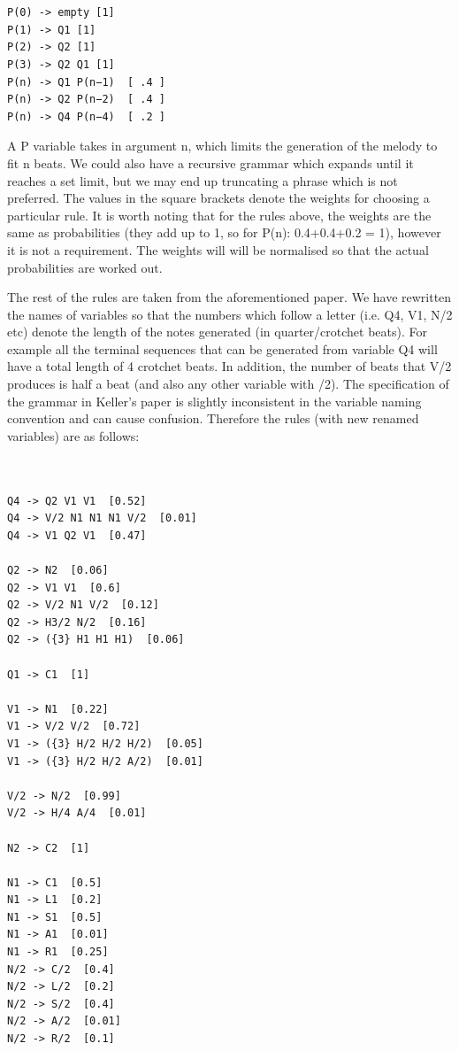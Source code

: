 \documentclass[pdftex,12pt,a4paper]{report}
\begin{document}
\begin{verbatim}


P(0) -> empty [1]
P(1) -> Q1 [1] 
P(2) -> Q2 [1] 
P(3) -> Q2 Q1 [1] 
P(n) -> Q1 P(n−1)  [ .4 ]
P(n) -> Q2 P(n−2)  [ .4 ] 
P(n) -> Q4 P(n−4)  [ .2 ]

\end{verbatim}

A P variable takes in argument n, which limits the generation of the melody to fit n beats. We could also have a recursive grammar which expands until it reaches a set limit, but we may end up truncating a phrase which is not preferred. The values in the square brackets denote the weights for choosing a particular rule. It is worth noting that for the rules above, the weights are the same as probabilities (they add up to 1, so for P(n):  0.4+0.4+0.2 = 1), however it is not a requirement. The weights will will be normalised so that the actual probabilities are worked out.

The rest of the rules are taken from the aforementioned paper. We have rewritten the names of variables so that the numbers which follow a letter (i.e. Q4, V1, N/2 etc) denote the length of the notes generated (in quarter/crotchet beats). For example all the terminal sequences that can be generated from variable Q4 will have a total length of 4 crotchet beats. In addition, the number of beats that V/2 produces is half a beat (and also any other variable with /2). The specification of the grammar in Keller's paper \cite{keller07} is slightly inconsistent in the variable naming convention and can cause confusion. Therefore the rules (with new renamed variables) are as follows:

\begin{verbatim}


Q4 -> Q2 V1 V1  [0.52]
Q4 -> V/2 N1 N1 N1 V/2  [0.01]
Q4 -> V1 Q2 V1  [0.47]

Q2 -> N2  [0.06]
Q2 -> V1 V1  [0.6]
Q2 -> V/2 N1 V/2  [0.12]
Q2 -> H3/2 N/2  [0.16]
Q2 -> ({3} H1 H1 H1)  [0.06]

Q1 -> C1  [1]

V1 -> N1  [0.22]
V1 -> V/2 V/2  [0.72]
V1 -> ({3} H/2 H/2 H/2)  [0.05]
V1 -> ({3} H/2 H/2 A/2)  [0.01]

V/2 -> N/2  [0.99]
V/2 -> H/4 A/4  [0.01]

N2 -> C2  [1]

N1 -> C1  [0.5]
N1 -> L1  [0.2]
N1 -> S1  [0.5]
N1 -> A1  [0.01]
N1 -> R1  [0.25]
N/2 -> C/2  [0.4]
N/2 -> L/2  [0.2]
N/2 -> S/2  [0.4]
N/2 -> A/2  [0.01]
N/2 -> R/2  [0.1]

\end{verbatim}
\end{document}
